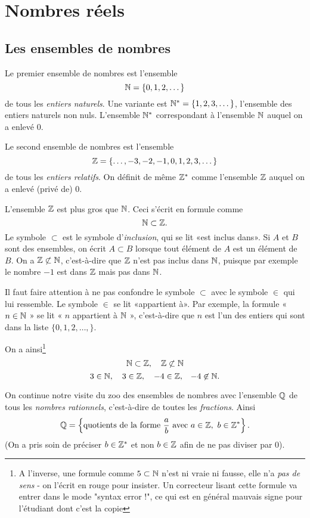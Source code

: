 \chapter{Nombres réels}

\section{Les ensembles de nombres}

Le premier ensemble de nombres est l'ensemble 
\[ \mathbb{N} = \{0,1,2,\dots\} \] 
de tous
les \emph{entiers naturels}. Une variante est $\mathbb{N}^* = \{1,2,3,\dots \}$, l'ensemble des entiers naturels non nuls. L'ensemble $\mathbb{N}^*$ correspondant à l'ensemble $\mathbb{N}$ auquel on a enlevé $0$.

Le second ensemble de nombres est l'ensemble
\[ \mathbb{Z} = \{ \dots, -3,-2,-1,0,1,2,3, \dots \} \]
de tous les \emph{entiers relatifs}. On définit de même $\mathbb{Z}^*$ comme l'ensemble $\mathbb{Z}$ auquel on a enlevé (privé de) $0$.

L'ensemble $\mathbb{Z}$ est plus gros que $\mathbb{N}$. Ceci s'écrit en formule comme
\[ \mathbb{N} \subset \mathbb{Z} .\]
Le symbole $\subset$ est le symbole d'\emph{inclusion}, qui se lit «est inclus dans». Si $A$ et $B$ sont des ensembles, on écrit $A \subset B$ lorsque tout élément de $A$ est un élément de $B$. On a $\mathbb{Z} \not \subset \mathbb{N}$, c'est-à-dire que $\mathbb{Z}$ n'est pas inclus dans $\mathbb{N}$, puisque par exemple le nombre $-1$ est dans $\mathbb{Z}$ mais pas dans $\mathbb{N}$.

Il faut faire attention à ne pas confondre le symbole $\subset$ avec le symbole $\in$ qui lui ressemble. Le symbole $\in$ se lit «appartient à». Par exemple, la formule « $n \in \mathbb{N}$ » se lit « $n$ appartient à $\mathbb{N}$ », c'est-à-dire que $n$ est l'un des entiers qui sont dans la liste $\{0,1,2,\dots,\}$.

On a ainsi\footnote{A l'inverse, une formule comme \textcolor{red}{$5 \subset \mathbb{N}$} n'est ni vraie ni fausse, elle n'a \emph{pas de sens} - on l'écrit en rouge pour insister. Un correcteur lisant cette formule va entrer dans le mode "syntax error !", ce qui est en général mauvais signe pour l'étudiant dont c'est la copie}
\[ \mathbb{N} \subset \mathbb{Z} , \ \ \ \mathbb{Z} \not\subset \mathbb{N} \]
\[ 3 \in \N , \ \ \ 3 \in \Z , \ \ \ -4 \in \Z, \ \ \, -4 \not\in \N .\]

On continue notre visite du zoo des ensembles de nombres avec l'ensemble $\mathbb{Q}$ de tous les \emph{nombres rationnels}, c'est-à-dire de toutes les \emph{fractions}. Ainsi
\[ \mathbb{Q} = \left\{ \textnormal{quotients de la forme } \frac{a}{b} \textnormal{ avec } a \in \mathbb{Z},\ b \in \mathbb{Z}^* \right\}.\]
(On a pris soin de préciser $b \in \mathbb{Z}^*$ et non $b \in \mathbb{Z}$ afin de ne pas diviser par $0$).

